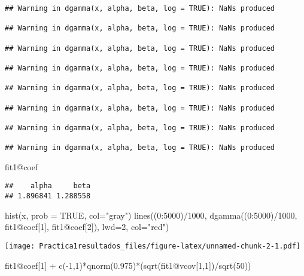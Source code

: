 \documentclass[
]{article}
\newenvironment{Shaded}{\begin{snugshade}}{\end{snugshade}}
\newcommand{\AttributeTok}[1]{\textcolor[rgb]{0.77,0.63,0.00}{#1}}
\newcommand{\ConstantTok}[1]{\textcolor[rgb]{0.00,0.00,0.00}{#1}}
\newcommand{\DecValTok}[1]{\textcolor[rgb]{0.00,0.00,0.81}{#1}}
\newcommand{\FloatTok}[1]{\textcolor[rgb]{0.00,0.00,0.81}{#1}}
\newcommand{\FunctionTok}[1]{\textcolor[rgb]{0.00,0.00,0.00}{#1}}
\newcommand{\NormalTok}[1]{#1}
\newcommand{\SpecialCharTok}[1]{\textcolor[rgb]{0.00,0.00,0.00}{#1}}
\newcommand{\StringTok}[1]{\textcolor[rgb]{0.31,0.60,0.02}{#1}}
\begin{document}
\begin{verbatim}
## Warning in dgamma(x, alpha, beta, log = TRUE): NaNs produced

## Warning in dgamma(x, alpha, beta, log = TRUE): NaNs produced

## Warning in dgamma(x, alpha, beta, log = TRUE): NaNs produced

## Warning in dgamma(x, alpha, beta, log = TRUE): NaNs produced

## Warning in dgamma(x, alpha, beta, log = TRUE): NaNs produced

## Warning in dgamma(x, alpha, beta, log = TRUE): NaNs produced

## Warning in dgamma(x, alpha, beta, log = TRUE): NaNs produced

## Warning in dgamma(x, alpha, beta, log = TRUE): NaNs produced
\end{verbatim}

\begin{Shaded}
\begin{Highlighting}[]
\NormalTok{fit1}\SpecialCharTok{@}\NormalTok{coef}
\end{Highlighting}
\end{Shaded}

\begin{verbatim}
##    alpha     beta 
## 1.896841 1.288558
\end{verbatim}

\begin{Shaded}
\begin{Highlighting}[]
\FunctionTok{hist}\NormalTok{(x, }\AttributeTok{prob =} \ConstantTok{TRUE}\NormalTok{, }\AttributeTok{col=}\StringTok{"gray"}\NormalTok{)}
\FunctionTok{lines}\NormalTok{((}\DecValTok{0}\SpecialCharTok{:}\DecValTok{5000}\NormalTok{)}\SpecialCharTok{/}\DecValTok{1000}\NormalTok{, }\FunctionTok{dgamma}\NormalTok{((}\DecValTok{0}\SpecialCharTok{:}\DecValTok{5000}\NormalTok{)}\SpecialCharTok{/}\DecValTok{1000}\NormalTok{, fit1}\SpecialCharTok{@}\NormalTok{coef[}\DecValTok{1}\NormalTok{], fit1}\SpecialCharTok{@}\NormalTok{coef[}\DecValTok{2}\NormalTok{]), }\AttributeTok{lwd=}\DecValTok{2}\NormalTok{, }\AttributeTok{col=}\StringTok{"red"}\NormalTok{)}
\end{Highlighting}
\end{Shaded}

\texttt{[image: Practica1resultados\_files/figure-latex/unnamed-chunk-2-1.pdf]}

\begin{Shaded}
\begin{Highlighting}[]
\NormalTok{fit1}\SpecialCharTok{@}\NormalTok{coef[}\DecValTok{1}\NormalTok{] }\SpecialCharTok{+} \FunctionTok{c}\NormalTok{(}\SpecialCharTok{{-}}\DecValTok{1}\NormalTok{,}\DecValTok{1}\NormalTok{)}\SpecialCharTok{*}\FunctionTok{qnorm}\NormalTok{(}\FloatTok{0.975}\NormalTok{)}\SpecialCharTok{*}\NormalTok{(}\FunctionTok{sqrt}\NormalTok{(fit1}\SpecialCharTok{@}\NormalTok{vcov[}\DecValTok{1}\NormalTok{,}\DecValTok{1}\NormalTok{])}\SpecialCharTok{/}\FunctionTok{sqrt}\NormalTok{(}\DecValTok{50}\NormalTok{))}
\end{Highlighting}
\end{Shaded}
\end{document}
